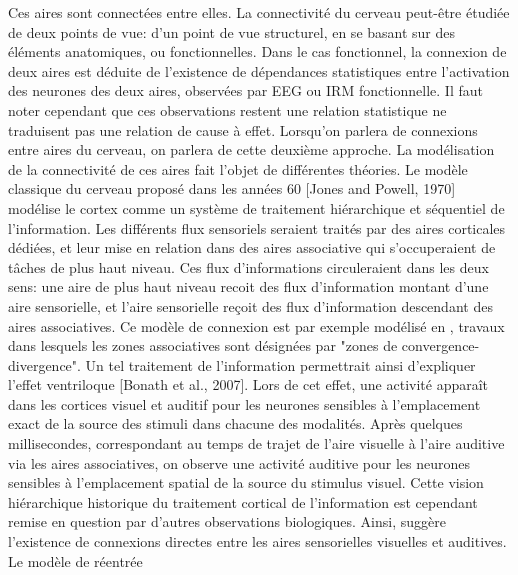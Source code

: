\documentclass[../main]{subfiles}
\begin{document}
Ces aires sont connectées entre elles. La connectivité du cerveau peut-être étudiée de deux points de vue: d'un point de vue structurel, en se basant sur des éléments anatomiques, ou fonctionnelles. Dans le cas fonctionnel, la connexion de deux aires est déduite de l'existence de dépendances statistiques entre l'activation des neurones des deux aires, observées par EEG ou IRM fonctionnelle. Il faut noter cependant que ces observations restent une relation statistique ne traduisent pas une relation de cause à effet. Lorsqu'on parlera de connexions entre aires du cerveau, on parlera de cette deuxième approche.
La modélisation de la connectivité de ces aires fait l'objet de différentes théories. Le modèle classique du cerveau proposé dans les années 60 [Jones and Powell, 1970] modélise le cortex comme un système de traitement hiérarchique et séquentiel de l'information. Les différents flux sensoriels seraient traités par des aires corticales dédiées, et leur mise en relation dans des aires associative qui s'occuperaient de tâches de plus haut niveau. Ces flux d'informations circuleraient dans les deux sens: une aire de plus haut niveau recoit des flux d'information montant d'une aire sensorielle, et l'aire sensorielle reçoit des flux d'information descendant des aires associatives. Ce modèle de connexion est par exemple modélisé en \cite{damasio_time-locked_1989}, travaux dans lesquels les zones associatives sont désignées par "zones de convergence-divergence".
Un tel traitement de l'information permettrait ainsi d'expliquer l'effet ventriloque [Bonath et al., 2007]. Lors de cet effet, une activité apparaît dans les cortices visuel et auditif pour les neurones sensibles à l'emplacement exact de la source des stimuli dans chacune des modalités. Après quelques millisecondes, correspondant au temps de trajet de l'aire visuelle à l'aire auditive via les aires associatives, on observe une activité auditive pour les neurones sensibles à l'emplacement spatial de la source du stimulus visuel.
Cette vision hiérarchique historique du traitement cortical de l'information est cependant remise en question par d'autres observations biologiques. Ainsi, \cite{eckert_cross-modal_2008} suggère l'existence de connexions directes entre les aires sensorielles visuelles et auditives. Le modèle de réentrée \cite{}




\end{document}
